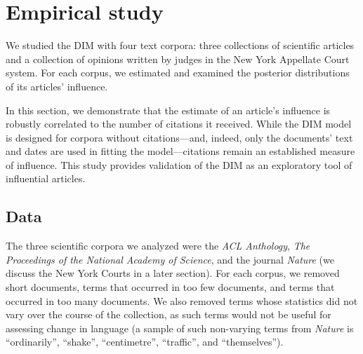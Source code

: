 \section{Empirical study}

We studied the DIM with four text corpora: three collections of
scientific articles and a collection of opinions written by judges in
the New York Appellate Court system.  For each corpus, we estimated
and examined the posterior distributions of its articles' influence.

In this section, we demonstrate that the estimate of an article's
influence is robustly correlated to the number of citations it
received.  While the DIM model is designed for corpora without
citations---and, indeed, only the documents' text and dates are used
in fitting the model---citations remain an established measure of
influence.  This study provides validation of the DIM as an
exploratory tool of influential articles.



\subsection*{Data}
\label{sec:data}




% 

The three scientific corpora we analyzed were the \emph{ACL
  Anthology}, \emph{The Proceedings of the National Academy of
  Science}, and the journal \emph{Nature} (we discuss the New York
Courts in a later section).  For each corpus, we removed short
documents, terms that occurred in too few documents, and terms that
occurred in too many documents.  We also removed terms whose
statistics did not vary over the course of the collection, as such
terms would not be useful for assessing change in language (a sample
of such non-varying terms from \emph{Nature} is ``ordinarily'',
``shake'', ``centimetre'', ``traffic'', and ``themselves'').

